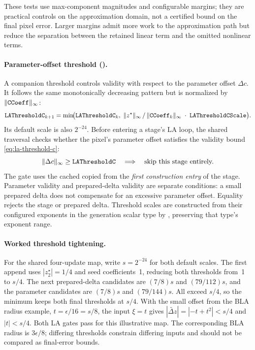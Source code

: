 These tests use max-component magnitudes and configurable margins;
they are practical controls on the approximation domain, not a
certified bound on the final pixel error. Larger margins admit more
work to the approximation path but reduce the separation between the
retained linear term and the omitted nonlinear terms.

\paragraph{Parameter-offset threshold ().}
A companion threshold  controls validity with respect
to the parameter offset \(\Delta c\).  It follows the same monotonically
decreasing pattern but is normalized by \(\lVert\texttt{CCoeff}\rVert_\infty\):
\begin{equation}
\texttt{LAThresholdC}_{k+1}
  = \min\!\bigl(
      \texttt{LAThresholdC}_k,\;
      \lVert z^\star\rVert_\infty \,/\,
      \lVert\texttt{CCoeff}_k\rVert_\infty
      \;\cdot\;\texttt{LAThresholdCScale}
    \bigr).
\label{eq:la-threshold-c}
\end{equation}
Its default scale is also $2^{-24}$. Before entering a stage's LA loop,
the shared traversal checks whether the pixel's
parameter offset satisfies the validity bound \eqref{eq:la-threshold-c}:
\[
\lVert \Delta c \rVert_\infty \ge \texttt{LAThresholdC}
  \quad\Longrightarrow\quad
  \text{skip this stage entirely.}
\]
The gate uses the cached  copied from the \emph{first
construction entry} of the stage. Parameter validity and prepared-delta validity
are separate
conditions: a small prepared delta does not compensate for an excessive
parameter offset. Equality rejects the stage or prepared delta.
Threshold scales are constructed from their configured exponents in
the generation scalar type by , preserving
that type's exponent range.

\paragraph{Worked threshold tightening.}
For the shared four-update map, write $s=2^{-24}$ for both default scales.
The first append uses $|z_2^\star|=1/4$ and seed coefficients~1, reducing
both thresholds from~1 to $s/4$. The next prepared-delta candidates are
$(7/8)s$ and $(79/112)s$, and the parameter candidates are
$(7/8)s$ and $(79/144)s$. All exceed $s/4$, so the minimum keeps
both final thresholds at $s/4$. With the small offset from the BLA radius
example, $t=\epsilon/16=s/8$, the input $\xi=t$ gives
$|\tilde{\Delta z}|=|{-t+t^2}|<s/4$ and $|t|<s/4$.
Both LA gates pass for this illustrative map. The corresponding BLA radius
is $3\epsilon/8$; differing thresholds constrain differing inputs and should
not be compared as final-error bounds.

